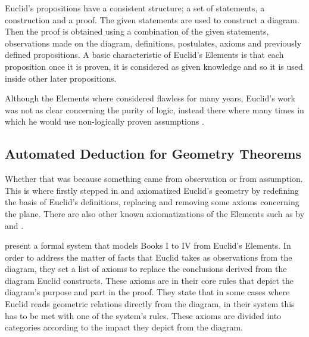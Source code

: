 \documentclass[]{interact}
\theoremstyle{plain}
\theoremstyle{definition}
\theoremstyle{remark}
\begin{document}
Euclid’s propositions have a consistent structure; a set of statements, a 
construction and a proof. The given statements are used to construct a diagram.
Then the proof is obtained using a combination of the given statements, 
observations made on the diagram, definitions, postulates, axioms and 
previously defined propositions. 
A basic characteristic of Euclid's
Elements is that each proposition once it is proven, it is considered
as given knowledge and so it is used inside other later propositions.

Although the Elements where considered flawless for many years,
Euclid's work was not as clear concerning the purity of logic, instead
there where many times in which he would use non-logically proven
assumptions \citep[Sections~1.1 and~2]{harrison:2009}.


\subsection{Automated Deduction for Geometry Theorems}
\label{sec:atp-geometry}

Whether that was because
something came from observation or from assumption. This is where
\citet{hilbert:1899} firstly stepped in and axiomatized
Euclid's geometry by redefining the basis of Euclid's definitions,
replacing and removing some axioms concerning the plane. There are
also other known axiomatizations of the Elements such as
by \citet{tarski:1959} and \citet{birkhoff:1932}.

\citet{avigad-etal:2009} present a formal system that models
Books I to IV from Euclid's Elements. In order to address the matter
of facts that Euclid takes as observations from the diagram, they set
a list of axioms to replace the conclusions derived from the diagram
Euclid constructs. These axioms are in their core rules that depict
the diagram's purpose and part in the proof. They state that in some
cases where Euclid reads geometric relations directly from the
diagram, in their system this has to be met with one of the system's
rules. These axioms are divided into categories according to the
impact they depict from the diagram.
\end{document}
